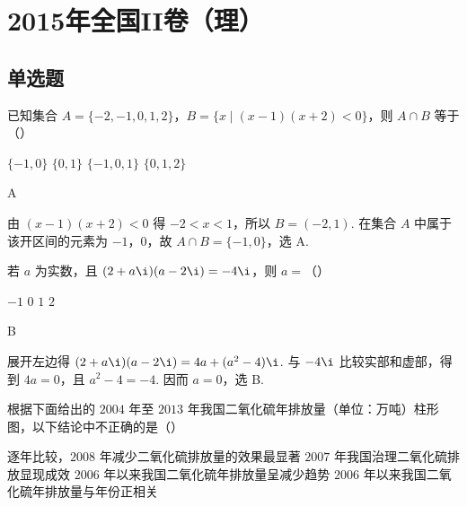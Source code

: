 \chapter{2015年全国II卷（理）}

\section{单选题}

\begin{problem}
已知集合 \(A=\{-2,-1,0,1,2\}\)，\(B=\{x\mid (x-1)(x+2)<0\}\)，则 \(A\cap B\) 等于（\quad）

\choices
    {\(\{-1,0\}\)}
    {\(\{0,1\}\)}
    {\(\{-1,0,1\}\)}
    {\(\{0,1,2\}\)}
\end{problem}

\begin{answer}
A
\end{answer}

\begin{solution}
由 \((x-1)(x+2)<0\) 得 \(-2<x<1\)，所以 \(B=(-2,1)\). 在集合 \(A\) 中属于该开区间的元素为 \(-1\)，\(0\)，故 \(A\cap B=\{-1,0\}\)，选 A.
\end{solution}

\begin{problem}
若 \(a\) 为实数，且 \((2+a\i)(a-2\i)=-4\i\)，则 \(a=\)（\quad）

\choices
    {\(-1\)}
    {\(0\)}
    {\(1\)}
    {\(2\)}
\end{problem}

\begin{answer}
B
\end{answer}

\begin{solution}
展开左边得 \((2+a\i)(a-2\i)=4a+(a^2-4)\i\). 与 \(-4\i\) 比较实部和虚部，得到 \(4a=0\)，且 \(a^2-4=-4\). 因而 \(a=0\)，选 B.
\end{solution}

\begin{problem}
根据下面给出的 \(2004\) 年至 \(2013\) 年我国二氧化硫年排放量（单位：万吨）柱形图，以下结论中不正确的是（\quad）


\choices
    {逐年比较，\(2008\) 年减少二氧化硫排放量的效果最显著}
    {\(2007\) 年我国治理二氧化硫排放显现成效}
    {\(2006\) 年以来我国二氧化硫年排放量呈减少趋势}
    {\(2006\) 年以来我国二氧化硫年排放量与年份正相关}
\end{problem}

